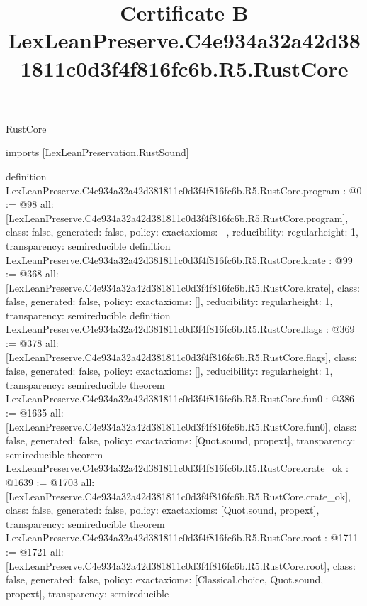 \begin{lexlean}{RustCore}
\title{Certificate B LexLeanPreserve.C4e934a32a42d381811c0d3f4f816fc6b.R5.RustCore}
\begin{coremodule}
imports [LexLeanPreservation.RustSound]

definition LexLeanPreserve.C4e934a32a42d381811c0d3f4f816fc6b.R5.RustCore.program : @0 := @98 {
  all: [LexLeanPreserve.C4e934a32a42d381811c0d3f4f816fc6b.R5.RustCore.program],
  class: false,
  generated: false,
  policy: exact{axioms: []},
  reducibility: regular{height: 1},
  transparency: semireducible
}
definition LexLeanPreserve.C4e934a32a42d381811c0d3f4f816fc6b.R5.RustCore.krate : @99 := @368 {
  all: [LexLeanPreserve.C4e934a32a42d381811c0d3f4f816fc6b.R5.RustCore.krate],
  class: false,
  generated: false,
  policy: exact{axioms: []},
  reducibility: regular{height: 1},
  transparency: semireducible
}
definition LexLeanPreserve.C4e934a32a42d381811c0d3f4f816fc6b.R5.RustCore.flags : @369 := @378 {
  all: [LexLeanPreserve.C4e934a32a42d381811c0d3f4f816fc6b.R5.RustCore.flags],
  class: false,
  generated: false,
  policy: exact{axioms: []},
  reducibility: regular{height: 1},
  transparency: semireducible
}
theorem LexLeanPreserve.C4e934a32a42d381811c0d3f4f816fc6b.R5.RustCore.fun0 : @386 := @1635 {
  all: [LexLeanPreserve.C4e934a32a42d381811c0d3f4f816fc6b.R5.RustCore.fun0],
  class: false,
  generated: false,
  policy: exact{axioms: [Quot.sound, propext]},
  transparency: semireducible
}
theorem LexLeanPreserve.C4e934a32a42d381811c0d3f4f816fc6b.R5.RustCore.crate_ok : @1639 := @1703 {
  all: [LexLeanPreserve.C4e934a32a42d381811c0d3f4f816fc6b.R5.RustCore.crate_ok],
  class: false,
  generated: false,
  policy: exact{axioms: [Quot.sound, propext]},
  transparency: semireducible
}
theorem LexLeanPreserve.C4e934a32a42d381811c0d3f4f816fc6b.R5.RustCore.root : @1711 := @1721 {
  all: [LexLeanPreserve.C4e934a32a42d381811c0d3f4f816fc6b.R5.RustCore.root],
  class: false,
  generated: false,
  policy: exact{axioms: [Classical.choice, Quot.sound, propext]},
  transparency: semireducible
}


\end{coremodule}
\end{lexlean}
